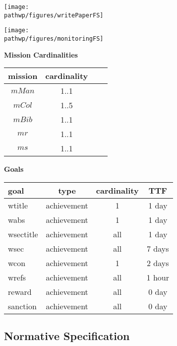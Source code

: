 \documentclass{article}
\newcommand{\goal}[1]{{\textsf{#1}}}
\newcommand{\pathwp}{../../examples/writePaper}
\theoremstyle{definition} \newtheorem{definition}{Definition}
\begin{document}
\begin{center}
  \texttt{[image: \\pathwp/figures/writePaperFS]}

  \texttt{[image: \\pathwp/figures/monitoringFS]}

  \newpage
  \textbf{Mission Cardinalities}

  \begin{tabular}{c c c c}
      \toprule
      mission & cardinality \\
      \midrule
      $mMan$ & 1..1 \\
      $mCol$ & 1..5 \\
      $mBib$ & 1..1 \\
      \midrule
      $mr$ & 1..1 \\
      $ms$ & 1..1 \\
     \bottomrule
   \end{tabular}

   \bigskip

   \textbf{Goals}

   \begin{tabular}{l c c c}
      \toprule
      goal & type & cardinality &  TTF \\
      \midrule
      \goal{wtitle} & achievement & 1 & 1 day\\
      \goal{wabs} & achievement & 1 & 1 day\\
      \goal{wsectitle} & achievement & all & 1 day\\
      \goal{wsec} & achievement & all & 7 days\\
      \goal{wcon} & achievement & 1 & 2 days\\
      \goal{wrefs} & achievement & all & 1 hour\\
      \midrule
      \goal{reward} & achievement & all & 0 day\\
      \goal{sanction} & achievement & all & 0 day\\
     \bottomrule
    \end{tabular}

\end{center}

\subsection{Normative Specification}
\end{document}
